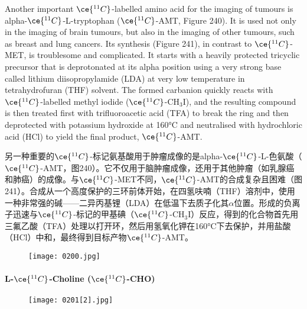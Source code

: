 \documentclass[dvipsnames, svgnames,a4paper,11pt]{article}
\begin{document}
Another important \(\ce{^{11}C}\)-labelled amino acid for the imaging of tumours is alpha-\(\ce{^{11}C}\)-L-tryptophan (\(\ce{^{11}C}\)-AMT, Figure 240). It is used not only in the imaging of brain tumours, but also in the imaging of other tumours, such as breast and lung cancers. Its synthesis (Figure 241), in contrast to \(\ce{^{11}C}\)-MET, is troublesome and complicated. It starts with a heavily protected tricyclic precursor that is deprotonated at its alpha position using a very strong base called lithium diisopropylamide (LDA) at very low temperature in tetrahydrofuran (THF) solvent. The formed carbanion quickly reacts with \(\ce{^{11}C}\)-labelled methyl iodide (\(\ce{^{11}C}\)-CH\(_3\)I), and the resulting compound is then treated first with trifluoroacetic acid (TFA) to break the ring and then deprotected with potassium hydroxide at 160°C and neutralised with hydrochloric acid (HCl) to yield the final product, \(\ce{^{11}C}\)-AMT.

另一种重要的\(\ce{^{11}C}\)-标记氨基酸用于肿瘤成像的是alpha-\(\ce{^{11}C}\)-L-色氨酸（\(\ce{^{11}C}\)-AMT，图240）。它不仅用于脑肿瘤成像，还用于其他肿瘤（如乳腺癌和肺癌）的成像。与\(\ce{^{11}C}\)-MET不同，\(\ce{^{11}C}\)-AMT的合成复杂且困难（图241）。合成从一个高度保护的三环前体开始，在四氢呋喃（THF）溶剂中，使用一种非常强的碱——二异丙基锂（LDA）在低温下去质子化其$\alpha$位置。形成的负离子迅速与\(\ce{^{11}C}\)-标记的甲基碘（\(\ce{^{11}C}\)-CH\(_3\)I）反应，得到的化合物首先用三氟乙酸（TFA）处理以打开环，然后用氢氧化钾在160°C下去保护，并用盐酸（HCl）中和，最终得到目标产物\(\ce{^{11}C}\)-AMT。

\begin{figure}[h]
	\centering
    \texttt{[image: 0200.jpg]}  
     \label{fig241}
\end{figure}

\paragraph{L-\(\ce{^{11}C}\)-Choline (\(\ce{^{11}C}\)-CHO) }  

\begin{wrapfigure}{r}{0.4\textwidth}
    \centering
    \texttt{[image: 0201[2].jpg]}
     \label{fig240}
\end{wrapfigure}
\end{document}
